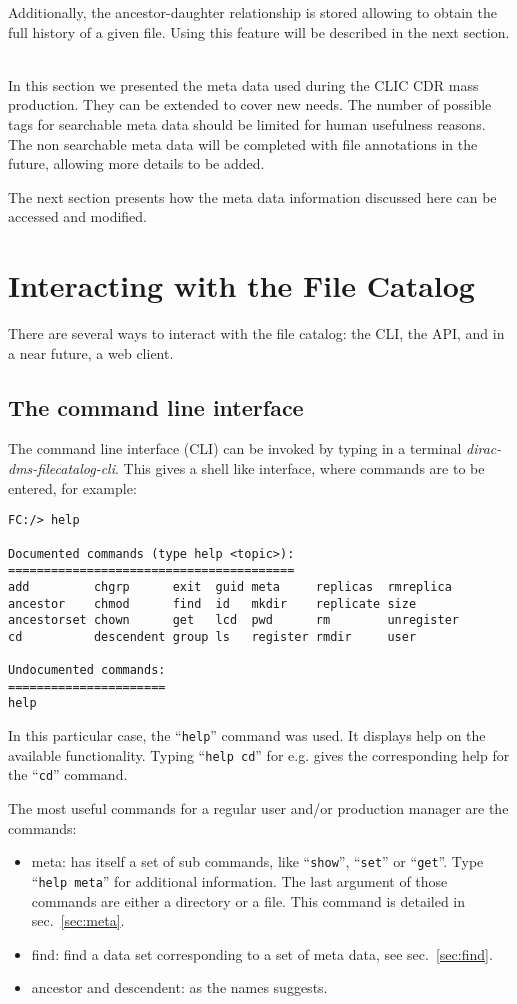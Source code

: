 \documentclass[11pt,a4paper]{scrartcl}
\begin{document}
Additionally, the ancestor-daughter relationship is stored allowing to obtain
the full history of a given file. Using this feature will be described in the next
section.

~\\

In this section we presented the meta data used during the CLIC CDR mass
production. They can be extended to cover new needs. The number of possible tags
for searchable meta data should be limited for human usefulness reasons. The non
searchable meta data will be completed with file annotations in the future, 
allowing more details to be added.

The next section presents how the meta data information discussed here can be
accessed and modified.

\section{Interacting with the File Catalog}\label{sec:usingfc}
There are several ways to interact with the file catalog: the CLI, the API, and
in a near future, a web client.

\subsection{The command line interface}
The command line interface (CLI) can be invoked by typing in a terminal
\emph{dirac-dms-filecatalog-cli}. This gives a shell like interface, where
commands are to be entered, for example:
\begin{lstlisting}
FC:/> help

Documented commands (type help <topic>):
========================================
add         chgrp      exit  guid meta     replicas  rmreplica 
ancestor    chmod      find  id   mkdir    replicate size      
ancestorset chown      get   lcd  pwd      rm        unregister
cd          descendent group ls   register rmdir     user      

Undocumented commands:
======================
help
\end{lstlisting}
In this particular case, the ``\lstinline|help|'' command was used. It displays
help on the available functionality. Typing ``\lstinline|help cd|'' for e.g. gives the
corresponding help for the ``\lstinline|cd|'' command.

The most useful commands for a regular user and/or production manager are the
commands:
\begin{itemize}
  \item meta: has itself a set of sub commands, like ``\lstinline|show|'',
  ``\lstinline|set|'' or ``\lstinline|get|''. Type ``\lstinline|help meta|'' for
  additional information. The last argument of those commands are either a 
  directory or a file. This command is detailed in sec.~\ref{sec:meta}.
  \item find: find a data set corresponding to a set of meta data, see
  sec.~\ref{sec:find}.
  \item ancestor and descendent: as the names suggests.
\end{itemize}
\end{document}
